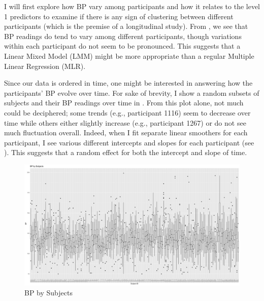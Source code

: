 \documentclass[12pt,twoside,leqno,fleqn,letterpaper]{article}
\theoremstyle{definition}
\theoremstyle{definition}
\begin{document}
I will first explore how BP vary among participants and how it relates to the level 1 predictors to examine if there is any sign of clustering between different participants (which is the premise of a longitudinal study). From , we see that BP readings do tend to vary among different participants, though variations within each participant do not seem to be pronounced. This suggests that a Linear Mixed Model (LMM) might be more appropriate than a regular Multiple Linear Regression (MLR).

Since our data is ordered in time, one might be interested in answering how the participants' BP evolve over time. For sake of brevity, I show a random subsets of subjects and their BP readings over time in . From this plot alone, not much could be deciphered; some trends (e.g., participant 1116) seem to decrease over time while others either slightly increase (e.g., participant 1267) or do not see much fluctuation overall. Indeed, when I fit separate linear smoothers for each participant, I see various different intercepts and slopes for each participant (see ). This suggests that a random effect for both the intercept and slope of time.

\begin{figure}
\centering
\includegraphics[width=\textwidth]{pics/bp by subjects.png}
\caption{BP by Subjects}
\label{fig: bp by subjects}
\end{figure}
\end{document}
